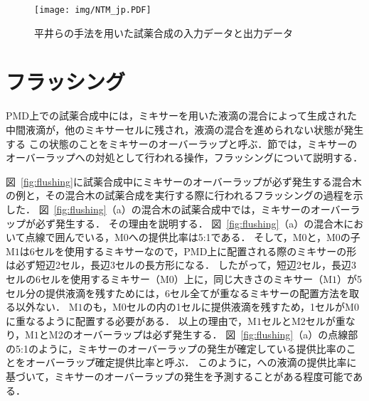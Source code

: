 \begin{figure}[tbp]
    \centering\texttt{[image: img/NTM\_jp.PDF]}
    \caption{平井らの手法を用いた試薬合成の入力データと出力データ}\label{fig:NTM}
\end{figure}


\section{フラッシング}
\label{sec:flushing}
    PMD上での試薬合成中には，ミキサーを用いた液滴の混合によって生成された中間液滴が，他のミキサーセルに残され，液滴の混合を進められない状態が発生する
    この状態のことをミキサーのオーバーラップと呼ぶ．節では，ミキサーのオーバーラップへの対処として行われる操作，フラッシングについて説明する．
    
    図~\ref{fig:flushing}に試薬合成中にミキサーのオーバーラップが必ず発生する混合木の例と，その混合木の試薬合成を実行する際に行われるフラッシングの過程を示した．
    図~\ref{fig:flushing}（a）の混合木の試薬合成中では，ミキサーのオーバーラップが必ず発生する．
    その理由を説明する．
    図~\ref{fig:flushing}（a）の混合木において点線で囲んでいる，M$0$への提供比率は5:1である．
    そして，M$0$と，M$0$の子M$1$は6セルを使用するミキサーなので，PMD上に配置される際のミキサーの形は必ず短辺2セル，長辺3セルの長方形になる．
    したがって，短辺2セル，長辺3セルの6セルを使用するミキサー（M$0$）上に，同じ大きさのミキサー（M$1$）が5セル分の提供液滴を残すためには，6セル全てが重なるミキサーの配置方法を取る以外ない．
    M$1$のも，M$0$セルの内の1セルに提供液滴を残すため，1セルがM$0$に重なるように配置する必要がある．
    以上の理由で，M$1$セルとM$2$セルが重なり，M$1$とM$2$のオーバーラップは必ず発生する．
    図~\ref{fig:flushing}（a）の点線部の5:1のように，ミキサーのオーバーラップの発生が確定している提供比率のことをオーバーラップ確定提供比率と呼ぶ．
    このように，への液滴の提供比率に基づいて，ミキサーのオーバーラップの発生を予測することがある程度可能である．
    
